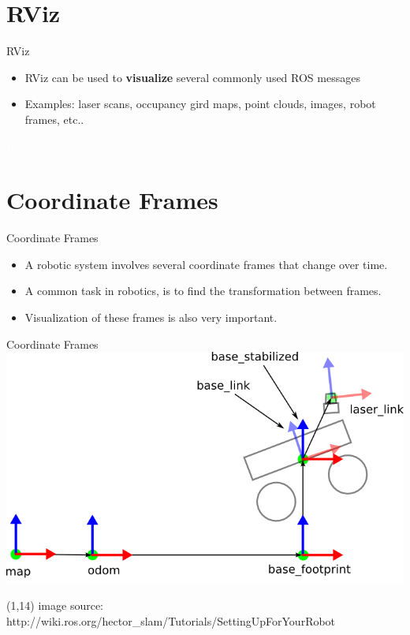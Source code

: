\documentclass{beamer}
\begin{document}
\section{RViz}
\begin{frame}{RViz}  
	
	\begin{itemize}
		\item RViz can be used to \textbf{visualize} several commonly used ROS messages
		\vspace{0.5cm}
		\item Examples: laser scans, occupancy gird maps, point clouds, images, robot frames, etc..
	\end{itemize}  
\end{frame}

\begin{frame}[plain]{}  
	\centering
	{\huge \textcolor{white}{RViz} }
\end{frame}



\section{Coordinate Frames}
\begin{frame}{Coordinate Frames}  
	
	\begin{itemize}
		\item A robotic system involves several coordinate frames that change over time.
		\vspace{0.5cm}
		\item A common task in robotics, is to find the transformation between frames.
		\vspace{0.5cm}
		\item Visualization of these frames is also very important.
	\end{itemize}  
\end{frame}


\begin{frame}{Coordinate Frames} 
	\centering
	\includegraphics[width=.8\linewidth]{figures/coordsystems_img.png} 
	\begin{textblock}{10}(1,14)
		\tiny{image source: http://wiki.ros.org/hector\_slam/Tutorials/SettingUpForYourRobot}
	\end{textblock} 	
\end{frame}
\end{document}
